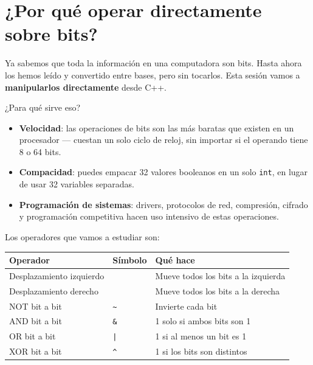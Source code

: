 \documentclass[12pt, oneside]{article}
\begin{document}

\tableofcontents
\newpage

\section{¿Por qué operar directamente sobre bits?}

Ya sabemos que toda la información en una computadora son bits.
Hasta ahora los hemos leído y convertido entre bases, pero sin tocarlos.
Esta sesión vamos a \textbf{manipularlos directamente} desde C++.

¿Para qué sirve eso?

\begin{itemize}
  \item \textbf{Velocidad}: las operaciones de bits son las más baratas que
        existen en un procesador — cuestan un solo ciclo de reloj, sin importar
        si el operando tiene 8 o 64 bits.
  \item \textbf{Compacidad}: puedes empacar 32 valores booleanos en un solo
        \texttt{int}, en lugar de usar 32 variables separadas.
  \item \textbf{Programación de sistemas}: drivers, protocolos de red,
        compresión, cifrado y programación competitiva hacen uso intensivo
        de estas operaciones.
\end{itemize}

Los operadores que vamos a estudiar son:

\begin{center}
\begin{tabular}{lll}
  \toprule
  \textbf{Operador} & \textbf{Símbolo} & \textbf{Qué hace} \\
  \midrule
  Desplazamiento izquierdo & \cpp{<<}                    & Mueve todos los bits a la izquierda \\
  Desplazamiento derecho   & \cpp{>>}                    & Mueve todos los bits a la derecha \\
  NOT bit a bit            & \texttt{\textasciitilde}    & Invierte cada bit \\
  AND bit a bit            & \texttt{\&}                 & 1 solo si ambos bits son 1 \\
  OR bit a bit             & \texttt{|}                  & 1 si al menos un bit es 1 \\
  XOR bit a bit            & \texttt{\textasciicircum}   & 1 si los bits son distintos \\
  \bottomrule
\end{tabular}
\end{center}
\end{document}

